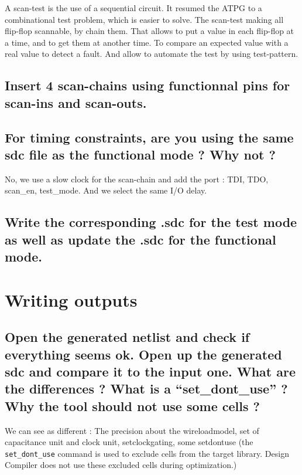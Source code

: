 \documentclass[11pt,a4paper,sans,dvipsnames]{report}
\begin{document}
	A scan-test is the use of a sequential circuit. It resumed the ATPG to a combinational test problem, which is easier to solve. The scan-test making all flip-flop scannable, by chain them. That allows to put a value in each flip-flop at a time, and to get them at another time. To compare an expected value with a real value to detect a fault. And allow to automate the test by using test-pattern.

	\subsection*{Insert 4 scan-chains using functionnal pins for scan-ins and scan-outs.}

	\begin{figure}[h!]
		\centering
		
		\label{fig:scan-chain commands}
	\end{figure}

	\subsection*{For timing constraints, are you using the same sdc file as the functional mode ? Why not ?}

	No, we use a slow clock for the scan-chain and add the port : TDI, TDO, scan\_en, test\_mode. And we select the same I/O delay.

	\subsection*{Write the corresponding .sdc for the test mode as well as update the .sdc for the functional mode.}

	\begin{figure}[h!]
		\centering
		
		\label{fig:scan-chain constraints}
	\end{figure}


	\section{Writing outputs}
	\subsection*{Open the generated netlist and check if everything seems ok. Open up the generated sdc and compare it to the input one. What are the differences ? What is a “set\_dont\_use” ? Why the tool should not use some cells ?}
	We can see as different :
	The precision about the wireloadmodel, set of capacitance unit and clock unit, setclockgating, some setdontuse (the \texttt{set\_dont\_use} command is used to exclude cells from the target library. Design Compiler does not use these excluded cells during optimization.)
\end{document}

